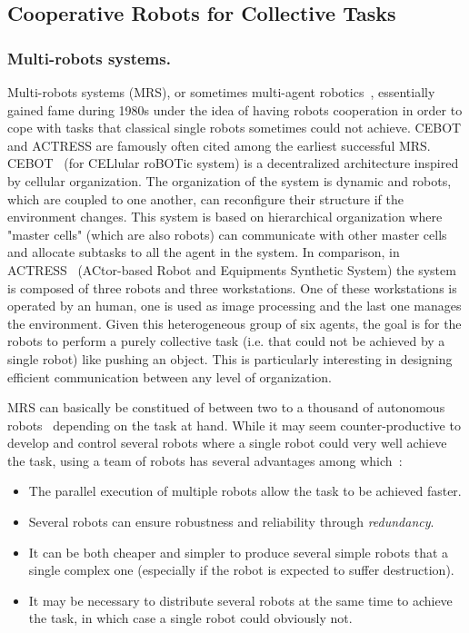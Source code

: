   \subsection{Cooperative Robots for Collective Tasks}

    \subsubsection{Multi-robots systems.} Multi-robots systems (MRS), or sometimes multi-agent robotics~\parencite{Dudek1996}, essentially gained fame during 1980s under the idea of having robots cooperation in order to cope with tasks that classical single robots sometimes could not achieve. CEBOT and ACTRESS are famously often cited among the earliest successful MRS. CEBOT~\parencite{Fukuda1988} (for CELlular roBOTic system) is a decentralized architecture inspired by cellular organization. The organization of the system is dynamic and robots, which are coupled to one another, can reconfigure their structure if the environment changes. This system is based on hierarchical organization where "master cells" (which are also robots) can communicate with other master cells and allocate subtasks to all the agent in the system. In comparison, in ACTRESS~\parencite{Asama1989} (ACtor-based Robot and Equipments Synthetic System) the system is composed of three robots and three workstations. One of these workstations is operated by an human, one is used as image processing and the last one manages the environment. Given this heterogeneous group of six agents, the goal is for the robots to perform a purely collective task (i.e. that could not be achieved by a single robot) like pushing an object. This is particularly interesting in designing efficient communication between any level of organization.

    MRS can basically be constitued of between two to a thousand of autonomous robots~\parencite{Rubenstein2014} depending on the task at hand. While it may seem counter-productive to develop and control several robots where a single robot could very well achieve the task, using a team of robots has several advantages among which~\parencite{Cao1997, Arkin1998}:

    \begin{itemize}
      \item{The parallel execution of multiple robots allow the task to be achieved faster.}
      \item{Several robots can ensure robustness and reliability through \emph{redundancy}.}
      \item{It can be both cheaper and simpler to produce several simple robots that a single complex one (especially if the robot is expected to suffer destruction).}
      \item{It may be necessary to distribute several robots at the same time to achieve the task, in which case a single robot could obviously not.}
    \end{itemize}


